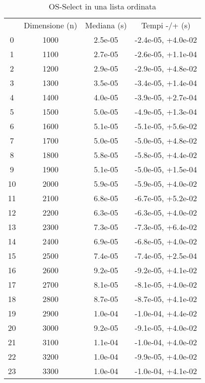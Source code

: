 \begin{table}
\centering
\caption{OS-Select in una lista ordinata}
\label{OS-Select in una lista ordinata}
\begin{adjustbox}{width=1\textwidth/2}
\begin{tabular}{|c|c|c|c|}
\hline
 & Dimensione (n) & Mediana (s) & Tempi -/+ (s) \\
0 & 1000 & 2.5e-05 & -2.4e-05, +4.0e-02 \\
\cline{1-4}
1 & 1100 & 2.7e-05 & -2.6e-05, +1.1e-04 \\
\cline{1-4}
2 & 1200 & 2.9e-05 & -2.9e-05, +4.8e-02 \\
\cline{1-4}
3 & 1300 & 3.5e-05 & -3.4e-05, +1.4e-04 \\
\cline{1-4}
4 & 1400 & 4.0e-05 & -3.9e-05, +2.7e-04 \\
\cline{1-4}
5 & 1500 & 5.0e-05 & -4.9e-05, +1.3e-04 \\
\cline{1-4}
6 & 1600 & 5.1e-05 & -5.1e-05, +5.6e-02 \\
\cline{1-4}
7 & 1700 & 5.0e-05 & -5.0e-05, +4.8e-02 \\
\cline{1-4}
8 & 1800 & 5.8e-05 & -5.8e-05, +4.4e-02 \\
\cline{1-4}
9 & 1900 & 5.1e-05 & -5.0e-05, +1.5e-04 \\
\cline{1-4}
10 & 2000 & 5.9e-05 & -5.9e-05, +4.0e-02 \\
\cline{1-4}
11 & 2100 & 6.8e-05 & -6.7e-05, +5.2e-02 \\
\cline{1-4}
12 & 2200 & 6.3e-05 & -6.3e-05, +4.0e-02 \\
\cline{1-4}
13 & 2300 & 7.3e-05 & -7.3e-05, +6.4e-02 \\
\cline{1-4}
14 & 2400 & 6.9e-05 & -6.8e-05, +4.0e-02 \\
\cline{1-4}
15 & 2500 & 7.4e-05 & -7.4e-05, +2.5e-04 \\
\cline{1-4}
16 & 2600 & 9.2e-05 & -9.2e-05, +4.1e-02 \\
\cline{1-4}
17 & 2700 & 8.1e-05 & -8.1e-05, +4.0e-02 \\
\cline{1-4}
18 & 2800 & 8.7e-05 & -8.7e-05, +4.1e-02 \\
\cline{1-4}
19 & 2900 & 1.0e-04 & -1.0e-04, +4.4e-02 \\
\cline{1-4}
20 & 3000 & 9.2e-05 & -9.1e-05, +4.0e-02 \\
\cline{1-4}
21 & 3100 & 1.1e-04 & -1.0e-04, +4.0e-02 \\
\cline{1-4}
22 & 3200 & 1.0e-04 & -9.9e-05, +4.0e-02 \\
\cline{1-4}
23 & 3300 & 1.0e-04 & -1.0e-04, +4.1e-02 \\

\end{tabular}
\end{adjustbox}
\end{table}

